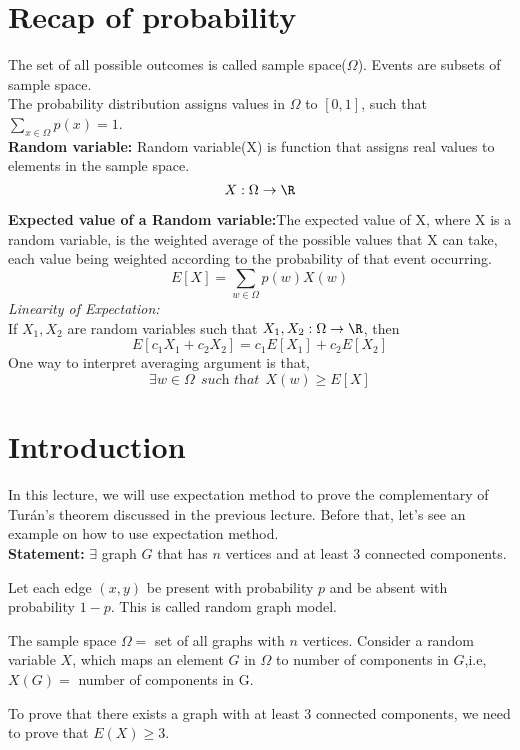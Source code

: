 \section{Recap of probability}

The set of all possible outcomes is called sample space($\Omega$). Events are subsets of sample space.\\
The probability distribution assigns values in $\Omega$ to $[0,1]$, such that 
$\sum_{x\in \Omega}p(x)=1$.\\

\textbf{Random variable:} Random variable(X) is function that assigns real values to elements in the sample space.
$$X:\Omega\rightarrow \R$$

\textbf{Expected value of a Random variable:}The expected value of X, where X is a random variable, is the weighted average of the possible values that X can take, each value being weighted according to the probability of that event occurring.
$$E[X]=\sum_{w\in \Omega}p(w)X(w)$$
\textit{Linearity of Expectation:}\\
If $X_1,X_2$ are random variables such that $X_1,X_2: \Omega \rightarrow \R$, then
$$E[c_1X_1+c_2X_2]=c_1E[X_1]+c_2E[X_2]$$
One way to interpret averaging argument is that,\\
$$\exists w\in \Omega ~~\textit{such that}~~ X(w)\ge E[X]$$




\section{Introduction}
In this lecture, we will use expectation method to prove the complementary of Tur\'an’s theorem discussed in the previous lecture.
Before that, let's see an example on how to use expectation method.\\
\textbf{Statement:} $\exists$ graph $G$ that has $n$ vertices and at least 3 connected components.

Let each edge $(x,y)$ be present with probability $p$ and be absent with probability $1-p$. This is called random graph model.

The sample space $\Omega=$ set of all graphs with $n$ vertices.
Consider a random variable $X$, which maps an element $G$ in $\Omega$ to number of components in $G$,i.e, $X(G)=$ number of components in G.

To prove that there exists a graph with at least 3 connected components, we need to prove that $E(X)\ge 3$.\\

